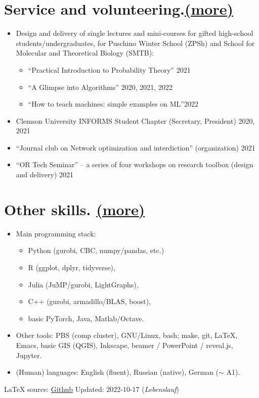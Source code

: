 \documentclass[11pt, a4paper]{article} \usepackage{geometry} %
\newcommand{\mhref}[1]{\hfill\href{#1}{\small (more\faExternalLink*)}}
\begin{document}
 \section*{Service and volunteering.\mhref{https://www.bochkarev.io/teaching/}}
   \begin{itemize}
      \itemsep0pt
    \item Design and delivery of single lectures and mini-courses for gifted
      high-school students/undergraduates, for Puschino Winter School
      (ZPSh) and School for Molecular and Theoretical Biology (SMTB):
      \begin{itemize}
        \itemsep0pt
        \item ``Practical Introduction to Probability Theory'' \hfill 2021
        \item ``A Glimpse into Algorithms'' \hfill 2020, 2021, 2022
        \item ``How to teach machines: simple examples on ML''\hfill 2022
      \end{itemize}
      \item Clemson University INFORMS Student Chapter (Secretary, President) \hfill 2020, 2021
      \item ``Journal club on Network optimization and interdiction'' (organization) \hfill 2021
      \item ``OR Tech Seminar'' -- a series of four workshops on research
        toolbox (design and delivery) \hfill 2021
\end{itemize}

\section*{Other skills. \mhref{https://www.bochkarev.io/notes/stack}}
\begin{itemize}
  \item Main programming stack:
    \begin{itemize}
      \itemsep0pt
      \item Python (gurobi, CBC, numpy/pandas, etc.)
      \item R (ggplot, dplyr, tidyverse),
      \item Julia (JuMP/gurobi, LightGraphs),
      \item C++ (gurobi, armadillo/BLAS, boost),
      \item basic PyTorch, Java, Matlab/Octave.
    \end{itemize}
  \item Other tools: PBS (comp cluster), GNU/Linux, bash; make, git, \LaTeX,
    Emacs, basic GIS (QGIS), Inkscape, beamer / PowerPoint / reveal.js, Jupyter.
  \item (Human) languages: English (fluent), Russian (native), German ($\sim$ A1).
  \end{itemize}

   {%
   \vfill\noindent\tiny\LaTeX{}
   source: \href{https://github.com/alex-bochkarev/AB-CV}{Github}\hfill
   Updated: 2022-10-17 (\textit{Lebenslauf})}
\end{document}
